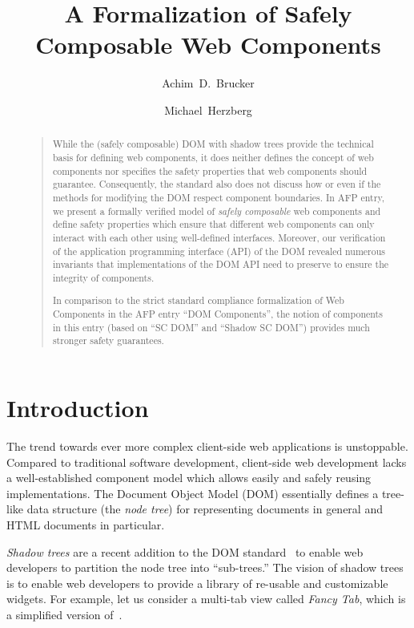 \documentclass[10pt,DIV16,a4paper,abstract=true,twoside=semi,openright]
{scrreprt}
\title{A Formalization of Safely Composable Web Components}
\author{Achim~D.~Brucker \and Michael~Herzberg}%
\begin{document}
  \maketitle
  \begin{abstract}
    \begin{quote}
      While the (safely composable) DOM with shadow trees provide the
      technical basis for defining web components, it does neither
      defines the concept of web components nor specifies the safety
      properties that web components should guarantee. Consequently,
      the standard also does not discuss how or even if the methods
      for modifying the DOM respect component boundaries. In AFP
      entry, we present a formally verified model of \emph{safely
        composable} web components and define safety properties which
      ensure that different web components can only interact with each
      other using well-defined interfaces. Moreover, our verification
      of the application programming interface (API) of the DOM
      revealed numerous invariants that implementations of the DOM API
      need to preserve to ensure the integrity of components.

      In comparison to the strict standard compliance formalization of
      Web Components in the AFP entry ``DOM Components'', the notion
      of components in this entry (based on ``SC DOM'' and
      ``Shadow SC DOM'') provides much stronger safety guarantees.

      \bigskip
    \end{quote}
  \end{abstract}


\tableofcontents
\cleardoublepage

\chapter{Introduction}
The trend towards ever more complex client-side web applications is
unstoppable. Compared to traditional software development, client-side
web development lacks a well-established component model which allows
easily and safely reusing implementations. The Document Object Model
(DOM) essentially defines a tree-like data structure (the \emph{node
tree}) for representing documents in general and HTML documents in
particular.

\emph{Shadow trees} are a recent addition to the DOM
standard~\cite{whatwg:dom:2019} to enable web developers to partition
the node tree into ``sub-trees.'' The vision of shadow trees is to
enable web developers to provide a library of re-usable and
customizable widgets. For example, let us consider a multi-tab view
called \emph{Fancy Tab}, which is a simplified version
of~\cite{bidelman:self-contained:2017}.
\end{document}
